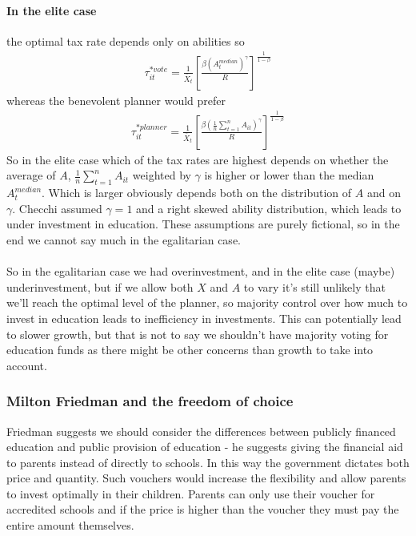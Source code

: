 \documentclass[12pt, a4paper]{article}
\begin{document}
\begin{multicols}{2}
\paragraph{In the elite case} the optimal tax rate depends only on abilities so 
\begin{align*}
\tau_{it}^{*vote} = \frac{1}{\bar{X}_t} \left[ \frac{\beta (A_{t}^{median})^{\gamma}}{R} \right]^{\frac{1}{1-\beta}}
\end{align*}
whereas the benevolent planner would prefer
\begin{align*}
\tau_{it}^{*planner} = \frac{1}{\bar{X}_t} \left[ \frac{\beta (\frac{1}{n} \sum_{t=1}^n A_{it} )^{\gamma}}{R} \right]^{\frac{1}{1-\beta}}
\end{align*}
So in the elite case which of the tax rates are highest depends on whether the average of $A$, $\frac{1}{n} \sum_{t=1}^n A_{it}$ weighted by $\gamma$ is higher or lower than the median $A_{t}^{median}$. Which is larger obviously depends both on the distribution of $A$ and on $\gamma$. Checchi assumed $\gamma = 1$ and a right skewed ability distribution, which leads to under investment in education. These assumptions are purely fictional, so in the end we cannot say much in the egalitarian case. 
\\ \\
So in the egalitarian case we had overinvestment, and in the elite case (maybe) underinvestment, but if we allow both $X$ and $A$ to vary it's still unlikely that we'll reach the optimal level of the planner, so majority control over how much to invest in education leads to inefficiency in investments. This can potentially lead to slower growth, but that is not to say we shouldn't have majority voting for education funds as there might be other concerns than growth to take into account. 

\subsubsection{Milton Friedman and the freedom of choice}
Friedman suggests we should consider the differences between publicly financed education and public provision of education - he suggests giving the financial aid to parents instead of directly to schools. In this way the government dictates both price and quantity. Such vouchers would increase the flexibility and allow parents to invest optimally in their children. Parents can only use their voucher for accredited schools and if the price is higher than the voucher they must pay the entire amount themselves. 


\end{multicols}
\end{document}

